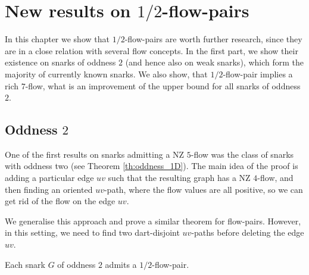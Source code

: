 \chapter{New results on $1/2$-flow-pairs} %
\label{ch:flow_pairs}

In this chapter we show that $1/2$-flow-pairs are worth further research, since they are in a close relation with several flow concepts. In the first part, we show their existence on snarks of oddness $2$ (and hence also on weak snarks), which form the majority of currently known snarks. We also show, that $1/2$-flow-pair implies a rich $7$-flow, what is an improvement of the upper bound for all snarks of oddness $2$.

\section{Oddness $2$}

One of the first results on snarks admitting a NZ $5$-flow was the class of snarks with oddness two (see Theorem \ref{th:oddness_1D}). The main idea of the proof is adding a particular edge $uv$ such that the resulting graph has a NZ $4$-flow, and then finding an oriented $uv$-path, where the flow values are all positive, so we can get rid of the flow on the edge $uv$.

We generalise this approach and prove a similar theorem for flow-pairs. However, in this setting, we need to find two dart-disjoint $uv$-paths before deleting the edge $uv$.

\begin{theorem}
Each snark $G$ of oddness $2$ admits a $1/2$-flow-pair.
\end{theorem}

